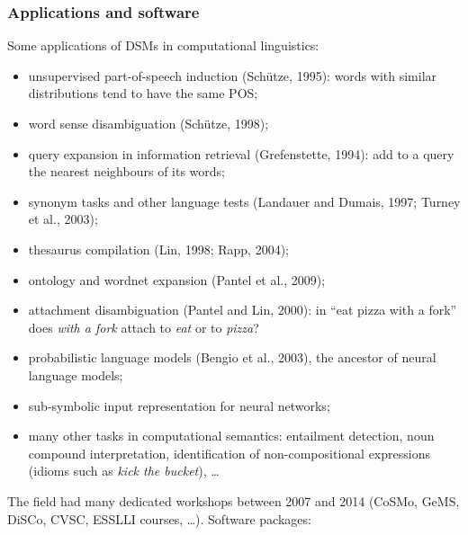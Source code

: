 \subsubsection{Applications and software}

Some applications of DSMs in computational linguistics:
\begin{itemize}[nosep]
  \item unsupervised part-of-speech induction (Schütze, 1995): words with similar
        distributions tend to have the same POS;
  \item word sense disambiguation (Schütze, 1998);
  \item query expansion in information retrieval (Grefenstette, 1994): add to a query
        the nearest neighbours of its words;
  \item synonym tasks and other language tests (Landauer and Dumais, 1997; Turney et
        al., 2003);
  \item thesaurus compilation (Lin, 1998; Rapp, 2004);
  \item ontology and wordnet expansion (Pantel et al., 2009);
  \item attachment disambiguation (Pantel and Lin, 2000): in ``eat pizza with a fork''
        does \emph{with a fork} attach to \emph{eat} or to \emph{pizza}?
  \item probabilistic language models (Bengio et al., 2003), the ancestor of neural
        language models;
  \item sub-symbolic input representation for neural networks;
  \item many other tasks in computational semantics: entailment detection, noun compound
        interpretation, identification of non-compositional expressions (idioms such as
        \emph{kick the bucket}), \ldots
\end{itemize}

The field had many dedicated workshops between 2007 and 2014 (CoSMo, GeMS, DiSCo, CVSC,
ESSLLI courses, \ldots). Software packages:

